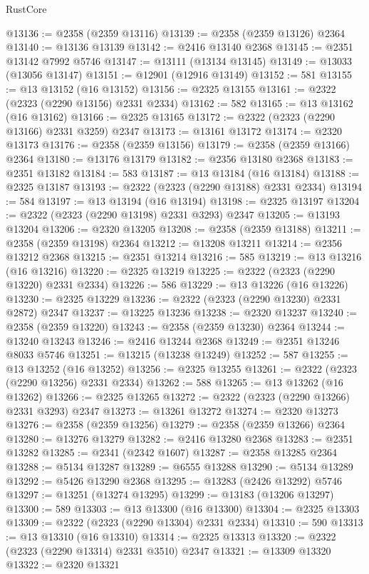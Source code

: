 \begin{lexlean}{RustCore}
\begin{coremodule}
@13136 := @2358 (@2359 @13116)
@13139 := @2358 (@2359 @13126) @2364
@13140 := @13136 @13139
@13142 := @2416 @13140 @2368
@13145 := @2351 @13142 @7992 @5746
@13147 := @13111 (@13134 @13145)
@13149 := @13033 (@13056 @13147)
@13151 := @12901 (@12916 @13149)
@13152 := 581
@13155 := @13 @13152 (@16 @13152)
@13156 := @2325 @13155
@13161 := @2322 (@2323 (@2290 @13156) @2331 @2334)
@13162 := 582
@13165 := @13 @13162 (@16 @13162)
@13166 := @2325 @13165
@13172 := @2322 (@2323 (@2290 @13166) @2331 @3259) @2347
@13173 := @13161 @13172
@13174 := @2320 @13173
@13176 := @2358 (@2359 @13156)
@13179 := @2358 (@2359 @13166) @2364
@13180 := @13176 @13179
@13182 := @2356 @13180 @2368
@13183 := @2351 @13182
@13184 := 583
@13187 := @13 @13184 (@16 @13184)
@13188 := @2325 @13187
@13193 := @2322 (@2323 (@2290 @13188) @2331 @2334)
@13194 := 584
@13197 := @13 @13194 (@16 @13194)
@13198 := @2325 @13197
@13204 := @2322 (@2323 (@2290 @13198) @2331 @3293) @2347
@13205 := @13193 @13204
@13206 := @2320 @13205
@13208 := @2358 (@2359 @13188)
@13211 := @2358 (@2359 @13198) @2364
@13212 := @13208 @13211
@13214 := @2356 @13212 @2368
@13215 := @2351 @13214
@13216 := 585
@13219 := @13 @13216 (@16 @13216)
@13220 := @2325 @13219
@13225 := @2322 (@2323 (@2290 @13220) @2331 @2334)
@13226 := 586
@13229 := @13 @13226 (@16 @13226)
@13230 := @2325 @13229
@13236 := @2322 (@2323 (@2290 @13230) @2331 @2872) @2347
@13237 := @13225 @13236
@13238 := @2320 @13237
@13240 := @2358 (@2359 @13220)
@13243 := @2358 (@2359 @13230) @2364
@13244 := @13240 @13243
@13246 := @2416 @13244 @2368
@13249 := @2351 @13246 @8033 @5746
@13251 := @13215 (@13238 @13249)
@13252 := 587
@13255 := @13 @13252 (@16 @13252)
@13256 := @2325 @13255
@13261 := @2322 (@2323 (@2290 @13256) @2331 @2334)
@13262 := 588
@13265 := @13 @13262 (@16 @13262)
@13266 := @2325 @13265
@13272 := @2322 (@2323 (@2290 @13266) @2331 @3293) @2347
@13273 := @13261 @13272
@13274 := @2320 @13273
@13276 := @2358 (@2359 @13256)
@13279 := @2358 (@2359 @13266) @2364
@13280 := @13276 @13279
@13282 := @2416 @13280 @2368
@13283 := @2351 @13282
@13285 := @2341 (@2342 @1607)
@13287 := @2358 @13285 @2364
@13288 := @5134 @13287
@13289 := @6555 @13288
@13290 := @5134 @13289
@13292 := @5426 @13290 @2368
@13295 := @13283 (@2426 @13292) @5746
@13297 := @13251 (@13274 @13295)
@13299 := @13183 (@13206 @13297)
@13300 := 589
@13303 := @13 @13300 (@16 @13300)
@13304 := @2325 @13303
@13309 := @2322 (@2323 (@2290 @13304) @2331 @2334)
@13310 := 590
@13313 := @13 @13310 (@16 @13310)
@13314 := @2325 @13313
@13320 := @2322 (@2323 (@2290 @13314) @2331 @3510) @2347
@13321 := @13309 @13320
@13322 := @2320 @13321

\end{coremodule}
\end{lexlean}
